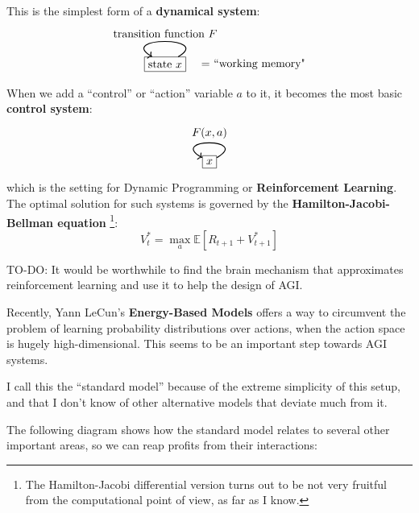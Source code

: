 This is the simplest form of a \textbf{dynamical system}:
\begin{equation}
\begin{tikzpicture}[->]
\node[rectangle,draw,label=0:{{$\quad =$} ``working memory"}] (C) {state $x$};
\path (C) edge [out=30,in=150,looseness=4,thick] node [above] {transition function $F$} (C);
\end{tikzpicture}
\end{equation}
When we add a ``control'' or ``action'' variable $a$ to it, it becomes the most basic  \textbf{control system}:
\begin{equation}
\begin{tikzpicture}[->]
\node[rectangle,draw] (C) {$x$};
\path (C) edge [out=30,in=150,looseness=7,thick] node [above] {$F(x, a)$} (C);
\end{tikzpicture}
\end{equation}
which is the setting for Dynamic Programming or \textbf{Reinforcement Learning}.  The optimal solution for such systems is governed by the \textbf{Hamilton-Jacobi-Bellman equation} \footnote{The Hamilton-Jacobi differential version turns out to be not very fruitful from the computational point of view, as far as I know.}:
\begin{equation}
V^*_t = \max_a \mathbb{E} [ R_{t+1} + V^*_{t+1} ]
\end{equation}

TO-DO:  It would be worthwhile to find the brain mechanism that approximates reinforcement learning and use it to help the design of AGI.  

Recently, Yann LeCun's \textbf{Energy-Based Models} offers a way to circumvent the problem of learning probability distributions over actions, when the action space is hugely high-dimensional.  This seems to be an important step towards AGI systems.

I call this the ``standard model'' because of the extreme simplicity of this setup, and that I don't know of other alternative models that deviate much from it.


The following diagram shows how the standard model relates to several other important areas, so we can reap profits from their interactions:

